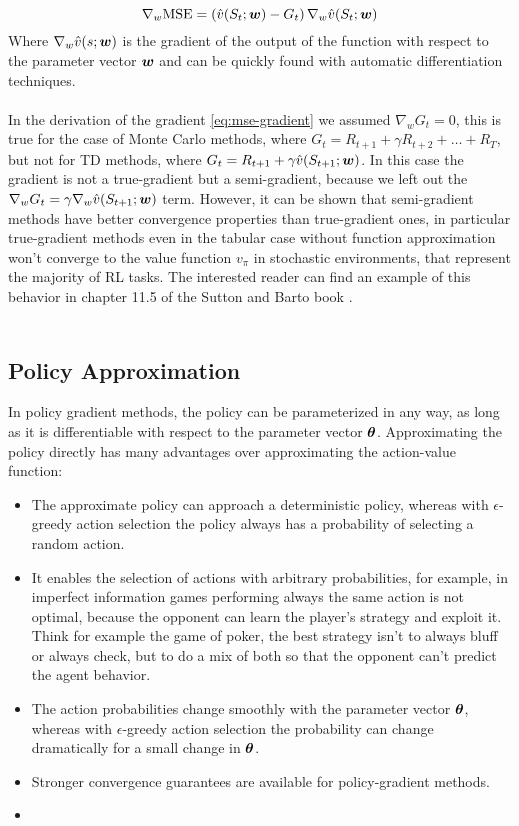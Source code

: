 \begin{equation}
    \nabla_{w} \mathrm{MSE} = \left( \hat{v}(S_t; \boldsymbol{w}) - G_t \right) \nabla_w \hat{v}(S_t; \boldsymbol{w})
    \label{eq:mse-gradient}
\end{equation}
Where $\nabla_w \hat{v}(s; \boldsymbol{w})$ is the gradient of the output of the function with respect to the parameter vector $\boldsymbol{w}$ and can be quickly found with automatic differentiation techniques.\\\\
In the derivation of the gradient \eqref{eq:mse-gradient} we assumed $\nabla_w G_t = 0$, this is true for the case of Monte Carlo methods, where $G_t = R_{t+1} + \gamma R_{t+2} + \dots + R_T$, but not for TD methods, where $G_t = R_{t+1} + \gamma \hat{v}(S_{t+1}; \boldsymbol{w})$. In this case the gradient is not a true-gradient but a semi-gradient, because we left out the $\nabla_w G_t = \gamma \nabla_w \hat{v}(S_{t+1}; \boldsymbol{w})$ term. However, it can be shown that semi-gradient methods have better convergence properties than true-gradient ones, in particular true-gradient methods even in the tabular case without function approximation  won't converge to the value function $v_{\pi}$ in stochastic environments, that represent the majority of RL tasks. The interested reader can find an example of this behavior in chapter 11.5 of the Sutton and Barto book \cite{sutton-barto}.\\\\

\subsection{Policy Approximation}
In policy gradient methods, the policy can be parameterized in any way, as long as it is differentiable with respect to the parameter vector $\boldsymbol{\theta}$. Approximating the policy directly has many advantages over approximating the action-value function:
\begin{itemize}
    \item The approximate policy can approach a deterministic policy, whereas with $\epsilon$-greedy action selection the policy always has a probability of selecting a random action.
    \item It enables the selection of actions with arbitrary probabilities, for example, in imperfect information games performing always the same action is not optimal, because the opponent can learn the player's strategy and exploit it. Think for example the game of poker, the best strategy isn't to always bluff or always check, but to do a mix of both so that the opponent can't predict the agent behavior.
    \item The action probabilities change smoothly with the parameter vector $\boldsymbol{\theta}$, whereas with $\epsilon$-greedy action selection the probability can change dramatically for a small change in $\boldsymbol{\theta}$.
    \item Stronger convergence guarantees are available for policy-gradient methods.
    \item 
\end{itemize}

